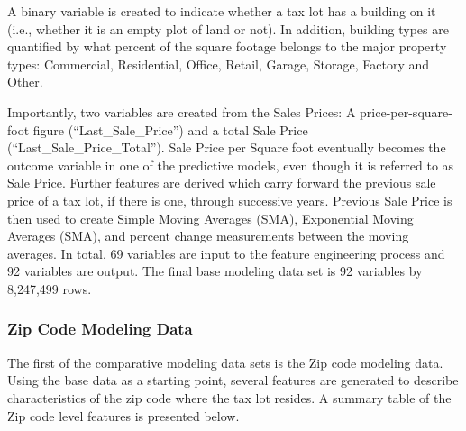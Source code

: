 \documentclass[]{article}
\begin{document}
A binary variable is created to indicate whether a tax lot has a
building on it (i.e., whether it is an empty plot of land or not). In
addition, building types are quantified by what percent of the square
footage belongs to the major property types: Commercial, Residential,
Office, Retail, Garage, Storage, Factory and Other.

Importantly, two variables are created from the Sales Prices: A
price-per-square-foot figure (``Last\_Sale\_Price'') and a total Sale
Price (``Last\_Sale\_Price\_Total''). Sale Price per Square foot
eventually becomes the outcome variable in one of the predictive models,
even though it is referred to as Sale Price. Further features are
derived which carry forward the previous sale price of a tax lot, if
there is one, through successive years. Previous Sale Price is then used
to create Simple Moving Averages (SMA), Exponential Moving Averages
(SMA), and percent change measurements between the moving averages. In
total, 69 variables are input to the feature engineering process and 92
variables are output. The final base modeling data set is 92 variables
by 8,247,499 rows.

\subsubsection{Zip Code Modeling Data}\label{zip-code-modeling-data}

The first of the comparative modeling data sets is the Zip code modeling
data. Using the base data as a starting point, several features are
generated to describe characteristics of the zip code where the tax lot
resides. A summary table of the Zip code level features is presented
below.
\end{document}
